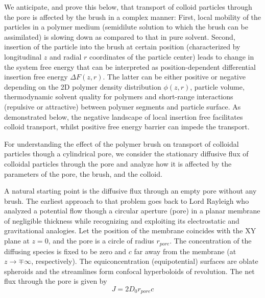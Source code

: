 \documentclass[12pt, a4paper]{article}
\begin{document}
We anticipate, and prove this below, that transport of colloid particles through the pore is affected by the brush in a complex manner: First, local mobility of the particles in a polymer medium
(semidilute solution to which the brush can be assimilated) is slowing down  as compared to that in pure solvent. Second, insertion of the particle into the brush at certain position
(characterized by longitudinal $z$ and radial $r$ coordinates of the particle center) leads to change in the system free energy that can be interpreted as position-dependent differential insertion free energy $\Delta F(z,r)$. 
The latter can be either positive or negative depending on the 2D polymer density distribution $\phi(z,r)$, particle volume, 
thermodynamic solvent quality for polymers and short-range interactions (repulsive or attractive) between polymer segments and particle surface. 
As demonstrated below, the negative landscape of local insertion free facilitates colloid transport, whilst positive free energy barrier can impede the transport.

For understanding the effect of the polymer brush on transport of colloidal particles though a cylindrical pore,
we consider the stationary diffusive flux of colloidal particles through the pore and analyze how it is affected by the parameters of the pore, the brush, and the colloid. 

A natural starting point is the diffusive flux through an empty pore without any brush. The earliest approach to that problem goes back to Lord Rayleigh 
who analyzed a potential flow though a circular aperture (pore) in a planar membrane of negligible thickness while recognizing and exploiting its electrostatic 
and gravitational analogies\cite{Strutt1878}.  
Let the position of the membrane coincides with the XY plane at  $z=0$, and the pore is a circle of radius $r_{pore}$. 
The concentration of the diffusing species is fixed to be zero and $c$ far away from the membrane (at   $z\rightarrow\mp\infty$, respectively).  
The equiconcentration (equipotential) surfaces are oblate spheroids and the streamlines form confocal hyperboloids of revolution\cite{Cooke1966}.
The net flux through the pore is given by
\begin{equation}
J=2D_0r_{pore}c\label{eq:flux_Ral}
\end{equation}
\end{document}
